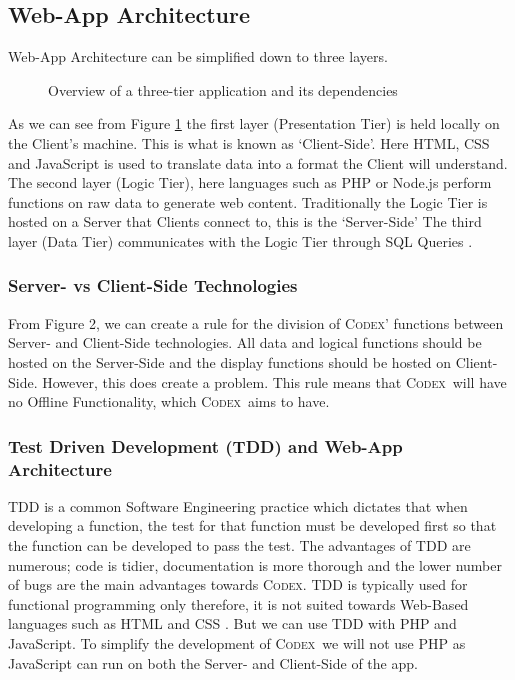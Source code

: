 \documentclass[review]{cmpreport}
\newcommand{\Codex}{\textsc{Codex}}
\begin{document}
	\subsection{Web-App Architecture} \label{Web-Arch}
	Web-App Architecture can be simplified down to three layers.
	\begin{figure}
		\centering
		\caption{Overview of a three-tier application and its dependencies \citep{SecurityWebApps}} \label{Web-App-Arch}
	\end{figure}
	As we can see from Figure \ref{Web-App-Arch} the first layer (Presentation Tier) is held locally on the Client's machine. This is what is known as `Client-Side'. Here HTML, CSS and JavaScript is used to translate data into a format the Client will understand. The second layer (Logic Tier), here languages such as PHP or Node.js perform functions on raw data to generate web content. Traditionally the Logic Tier is hosted on a Server that Clients connect to, this is the `Server-Side' The third layer (Data Tier) communicates with the Logic Tier through SQL Queries \citep{SecurityWebApps}.
	
	\subsubsection{Server- vs Client-Side Technologies}
	From Figure 2, we can create a rule for the division of \Codex' functions between Server- and Client-Side technologies. All data and logical functions should be hosted on the Server-Side and the display functions should be hosted on Client-Side. However, this does create a problem. This rule means that \Codex \ will have no Offline Functionality, which \Codex \ aims to have.
	
	\subsubsection{Test Driven Development (TDD) and Web-App Architecture}
	TDD is a common Software Engineering practice which dictates that when developing a function, the test for that function must be developed first so that the function can be developed to pass the test. The advantages of TDD are numerous; code is tidier, documentation is more thorough and the lower number of bugs are the main advantages towards \Codex. TDD is typically used for functional programming only therefore, it is not suited towards Web-Based languages such as HTML and CSS \citep{TDD}. But we can use TDD with PHP and JavaScript. To simplify the development of \Codex \ we will not use PHP as JavaScript can run on both the Server- and Client-Side of the app.
\end{document}
